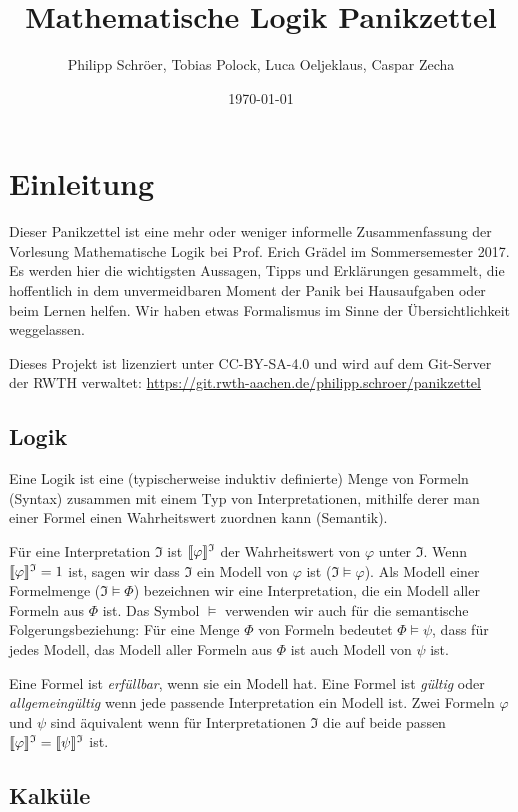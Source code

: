 \documentclass[a4paper,parskip=half*,DIV=15,fontsize=11pt]{scrartcl}
\title{Mathematische Logik Panikzettel}
\author{Philipp Schröer, Tobias Polock, Luca Oeljeklaus, Caspar Zecha}
\date{\today}
\DeclarePairedDelimiter\interpret{\llbracket}{\rrbracket}
\newcommand{\J}{\mathfrak{I}}
\begin{document}
\maketitle

\setcounter{tocdepth}{2}
\tableofcontents

\section{Einleitung}

Dieser Panikzettel ist eine mehr oder weniger informelle Zusammenfassung der Vorlesung Mathematische Logik bei Prof. Erich Grädel im Sommersemester 2017. Es werden hier die wichtigsten Aussagen, Tipps und Erklärungen gesammelt, die hoffentlich in dem unvermeidbaren Moment der Panik bei Hausaufgaben oder beim Lernen helfen. Wir haben etwas Formalismus im Sinne der Übersichtlichkeit weggelassen.

Dieses Projekt ist lizenziert unter CC-BY-SA-4.0 und wird auf dem Git-Server der RWTH verwaltet:
\url{https://git.rwth-aachen.de/philipp.schroer/panikzettel}

\subsection{Logik}
Eine Logik ist eine (typischerweise induktiv definierte) Menge von Formeln (Syntax) zusammen mit einem Typ von Interpretationen, mithilfe derer man einer Formel einen Wahrheitswert zuordnen kann (Semantik).

Für eine Interpretation $\J$ ist $\interpret{\varphi}^\J$ der Wahrheitswert von $\varphi$ unter $\J$. Wenn $\interpret{\varphi}^\J = 1$ ist, sagen wir dass $\J$ ein Modell von $\varphi$ ist ($\J \models \varphi$). Als Modell einer Formelmenge ($\J \models \Phi$) bezeichnen wir eine Interpretation, die ein Modell aller Formeln aus $\Phi$ ist. Das Symbol $\models$ verwenden wir auch für die semantische Folgerungsbeziehung: Für eine Menge $\Phi$ von Formeln bedeutet $\Phi \models \psi$, dass für jedes Modell, das Modell aller Formeln aus $\Phi$ ist auch Modell von $\psi$ ist.

Eine Formel ist \emph{erfüllbar}, wenn sie ein Modell hat. Eine Formel ist \emph{gültig} oder \emph{allgemeingültig} wenn jede passende Interpretation ein Modell ist. Zwei Formeln $\varphi$ und $\psi$ sind äquivalent wenn für Interpretationen $\J$ die auf beide passen $\interpret{\varphi}^\J = \interpret{\psi}^\J$ ist.

\subsection{Kalküle}
\end{document}
